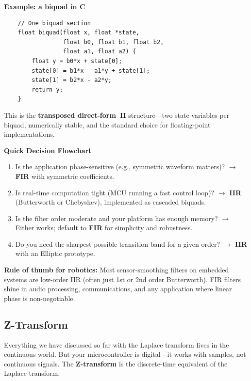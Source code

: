 \textbf{Example: a biquad in C}
\begin{verbatim}
    // One biquad section
    float biquad(float x, float *state,
                 float b0, float b1, float b2,
                 float a1, float a2) {
        float y = b0*x + state[0];
        state[0] = b1*x - a1*y + state[1];
        state[1] = b2*x - a2*y;
        return y;
    }
\end{verbatim}

This is the \textbf{transposed direct-form~II} structure---two state variables per
biquad, numerically stable, and the standard choice for floating-point
implementations.

\vspace{0.5em}
\begin{mdframed}[linewidth=1pt, innertopmargin=10pt, innerbottommargin=10pt]
\textbf{Quick Decision Flowchart}

\vspace{0.3em}
\begin{enumerate}[nosep]
    \item Is the application phase-sensitive (e.g., symmetric waveform matters)?
          $\rightarrow$ \textbf{FIR} with symmetric coefficients.
    \item Is real-time computation tight (MCU running a fast control loop)?
          $\rightarrow$ \textbf{IIR} (Butterworth or Chebyshev), implemented as
          cascaded biquads.
    \item Is the filter order moderate and your platform has enough memory?
          $\rightarrow$ Either works; default to \textbf{FIR} for simplicity and
          robustness.
    \item Do you need the sharpest possible transition band for a given order?
          $\rightarrow$ \textbf{IIR} with an Elliptic prototype.
\end{enumerate}

\textbf{Rule of thumb for robotics:} Most sensor-smoothing filters on embedded
systems are low-order IIR (often just 1st or 2nd order Butterworth). FIR filters
shine in audio processing, communications, and any application where linear phase
is non-negotiable.
\end{mdframed}

\subsection{Z-Transform}

Everything we have discussed so far with the Laplace transform lives in the continuous world. But your microcontroller is digital---it works with samples, not continuous signals. The \textbf{Z-transform} is the discrete-time equivalent of the Laplace transform.

